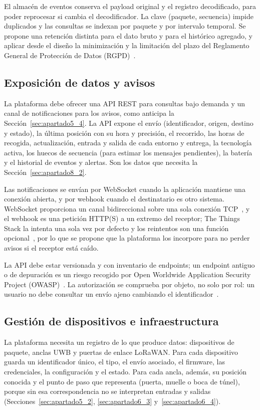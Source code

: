 \documentclass[11pt,a4paper]{article}
\begin{document}
El almacén de eventos conserva el payload original y el registro decodificado, para poder reprocesar si cambia el decodificador. La clave (paquete, secuencia) impide duplicados y las consultas se indexan por paquete y por intervalo temporal. Se propone una retención distinta para el dato bruto y para el histórico agregado, y aplicar desde el diseño la minimización y la limitación del plazo del Reglamento General de Protección de Datos (RGPD)~\cite{ref45}.

\subsection{Exposición de datos y avisos}
\label{sec:apartado7_4}

La plataforma debe ofrecer una API REST para consultas bajo demanda y un canal de notificaciones para los avisos, como anticipa la Sección~\ref{sec:apartado5_4}. La API expone el envío (identificador, origen, destino y estado), la última posición con su hora y precisión, el recorrido, las horas de recogida, actualización, entrada y salida de cada entorno y entrega, la tecnología activa, los huecos de secuencia (para estimar los mensajes pendientes), la batería y el historial de eventos y alertas. Son los datos que necesita la Sección~\ref{sec:apartado8_2}.

Las notificaciones se envían por WebSocket cuando la aplicación mantiene una conexión abierta, y por webhook cuando el destinatario es otro sistema. WebSocket proporciona un canal bidireccional sobre una sola conexión TCP~\cite{ref46}, y el webhook es una petición HTTP(S) a un extremo del receptor; The Things Stack la intenta una sola vez por defecto y los reintentos son una función opcional~\cite{ref47}, por lo que se propone que la plataforma los incorpore para no perder avisos si el receptor está caído.

La API debe estar versionada y con inventario de endpoints; un endpoint antiguo o de depuración es un riesgo recogido por Open Worldwide Application Security Project (OWASP)~\cite{ref48}. La autorización se comprueba por objeto, no solo por rol: un usuario no debe consultar un envío ajeno cambiando el identificador~\cite{ref48}.

\subsection{Gestión de dispositivos e infraestructura}
\label{sec:apartado7_5}

La plataforma necesita un registro de lo que produce datos: dispositivos de paquete, anclas UWB y puertas de enlace LoRaWAN. Para cada dispositivo guarda un identificador único, el tipo, el envío asociado, el firmware, las credenciales, la configuración y el estado. Para cada ancla, además, su posición conocida y el punto de paso que representa (puerta, muelle o boca de túnel), porque sin esa correspondencia no se interpretan entradas y salidas (Secciones~\ref{sec:apartado5_2}, \ref{sec:apartado6_3} y~\ref{sec:apartado6_4}).
\end{document}
